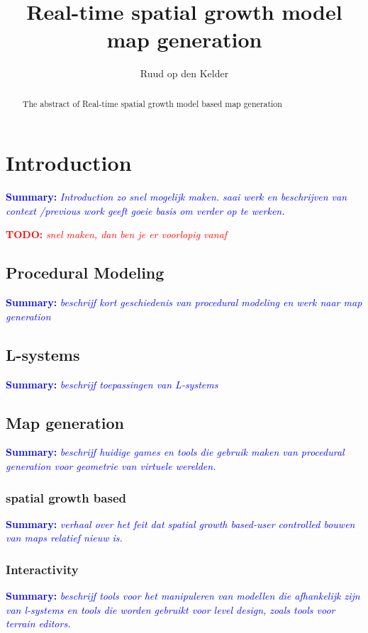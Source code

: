 \documentclass{article}
\title{Real-time spatial growth model map generation}
\author{Ruud op den Kelder}
\newcommand{\todo}[1]{\textcolor{red}{\textbf{TODO: }\it{#1}}}
\newcommand{\inhoud}[1]{\textcolor{blue}{\textbf{Summary: }\it{#1}}}
\begin{document}
\maketitle

\begin{abstract}
The abstract of Real-time spatial growth model based map generation
\end{abstract}

\tableofcontents

\section{Introduction}
\inhoud{Introduction zo snel mogelijk maken. saai werk en beschrijven van context /previous work 
geeft goeie basis om verder op te werken. }

\todo{snel maken, dan ben je er voorlopig vanaf}

\subsection{Procedural Modeling}
\inhoud{beschrijf kort geschiedenis van procedural modeling en werk naar map generation}

\subsection{L-systems}
\inhoud{beschrijf toepassingen van L-systems}

\subsection{Map generation}
\inhoud{beschrijf huidige games en tools die gebruik maken van procedural generation voor geometrie van virtuele werelden.}

\subsubsection{spatial growth based}
\inhoud{verhaal over het feit dat spatial growth based-user controlled bouwen van maps relatief nieuw is.}

\subsubsection{Interactivity}
\inhoud{beschrijf tools voor het manipuleren van modellen die afhankelijk zijn van l-systems en tools die worden 
	gebruikt voor level design, zoals tools voor terrain editors.}
\end{document}
